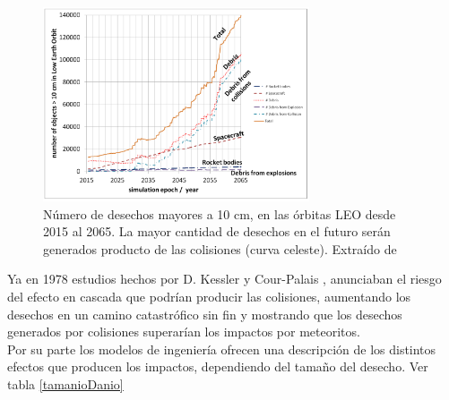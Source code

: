 \begin{figure}[!h]
  \centering
  \includegraphics[width=0.7\textwidth]{imagenes/debriscollision}
  \caption[N\'umero de Desechos en las \'orbitas LEO desde 2015 al 2065]{N\'umero de desechos mayores a 10 cm, en las \'orbitas LEO desde 2015 al 2065. La mayor cantidad de desechos en el futuro ser\'an generados producto de las colisiones (curva celeste). Extra\'ido de \citep{karacalioglu2016impact}}
  \label{fig:debriscollision}
\end{figure}

Ya en 1978  estudios hechos por D. Kessler y Cour-Palais
 \cite{kessler0}, anunciaban el riesgo del efecto en cascada que podr\'ian producir las colisiones, aumentando los desechos en un camino catastr\'ofico sin fin y mostrando que los desechos generados por colisiones superar\'ian los impactos por meteoritos.\\
 
 Por su parte los modelos de ingenier\'ia ofrecen una descripci\'on de los distintos efectos que producen los impactos, dependiendo del tama\~no del desecho. Ver tabla \ref{tamanioDanio}\\
 
